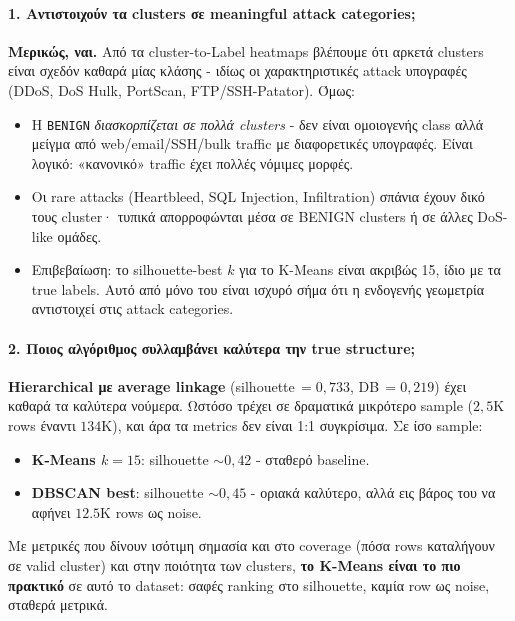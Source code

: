 \documentclass[12pt,a4paper,twoside]{book}
\begin{document}
\paragraph{1. Αντιστοιχούν τα clusters σε meaningful attack categories;}
\textbf{Μερικώς, ναι.} Από τα cluster-to-Label heatmaps βλέπουμε ότι
αρκετά clusters είναι σχεδόν καθαρά μίας κλάσης - ιδίως οι
χαρακτηριστικές attack υπογραφές (DDoS, DoS Hulk, PortScan,
FTP/SSH-Patator). Όμως:
\begin{itemize}
    \item Η \texttt{BENIGN} \emph{διασκορπίζεται σε πολλά clusters} -
    δεν είναι ομοιογενής class αλλά μείγμα από web/email/SSH/bulk traffic
    με διαφορετικές υπογραφές. Είναι λογικό: «κανονικό» traffic έχει πολλές
    νόμιμες μορφές.
    \item Οι rare attacks (Heartbleed, SQL Injection, Infiltration)
    σπάνια έχουν δικό τους cluster· τυπικά απορροφώνται μέσα σε
    BENIGN clusters ή σε άλλες DoS-like ομάδες.
    \item Επιβεβαίωση: το silhouette-best \(k\) για το K-Means είναι
    ακριβώς 15, ίδιο με τα true labels. Αυτό από μόνο του είναι ισχυρό
    σήμα ότι η ενδογενής γεωμετρία αντιστοιχεί στις attack categories.
\end{itemize}

\paragraph{2. Ποιος αλγόριθμος συλλαμβάνει καλύτερα την true structure;}
\textbf{Hierarchical με average linkage} (silhouette\,\(=0{,}733\),
DB\,\(=0{,}219\)) έχει καθαρά τα καλύτερα νούμερα. Ωστόσο τρέχει σε
δραματικά μικρότερο sample (\(2{,}5\)K rows έναντι \(134\)K), και
άρα τα metrics δεν είναι 1:1 συγκρίσιμα. Σε ίσο sample:
\begin{itemize}
    \item \textbf{K-Means \(k=15\)}: silhouette \(\sim 0{,}42\) -
    σταθερό baseline.
    \item \textbf{DBSCAN best}: silhouette \(\sim 0{,}45\) - οριακά
    καλύτερο, αλλά εις βάρος του να αφήνει \(12.5\)K rows ως noise.
\end{itemize}
Με μετρικές που δίνουν ισότιμη σημασία και στο coverage (πόσα rows
καταλήγουν σε valid cluster) και στην ποιότητα των clusters,
\textbf{το K-Means είναι το πιο πρακτικό} σε αυτό το dataset: σαφές
ranking στο silhouette, καμία row ως noise, σταθερά μετρικά.
\end{document}
